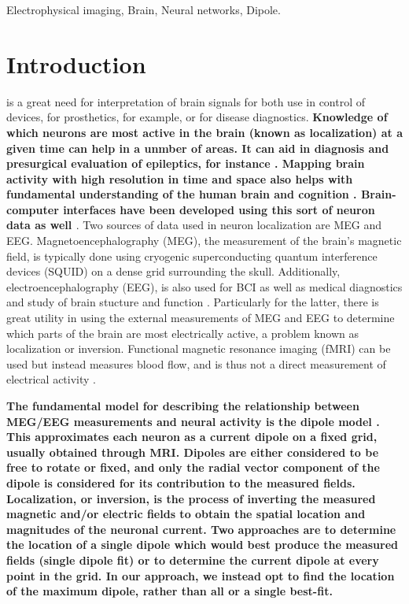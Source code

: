 \documentclass[journal,12pt,onecolumn,draftclsnofoot,]{IEEEtran}
\begin{document}
\begin{IEEEkeywords}
Electrophysical imaging, Brain, Neural networks, Dipole.
\end{IEEEkeywords}



\IEEEpeerreviewmaketitle



\section{Introduction}

 is a great need for interpretation of brain signals for both use in control of devices, for prosthetics, for example, or for disease diagnostics. \textbf{Knowledge of which neurons are most active in the brain (known as localization) at a given time can help in a unmber of areas. It can aid in diagnosis and presurgical evaluation of epileptics, for instance \cite{knake2006value}. Mapping brain activity with high resolution in time and space also helps with fundamental understanding of the human brain and cognition \cite{de2001localization}. Brain-computer interfaces have been developed using this sort of neuron data as well \cite{mellinger2007meg}}. Two sources of data used in neuron localization are MEG and EEG. Magnetoencephalography (MEG), the measurement of the brain's magnetic field, is typically done using cryogenic superconducting quantum interference devices (SQUID) on a dense grid surrounding the skull. Additionally, electroencephalography (EEG), is also used for BCI as well as medical diagnostics and study of brain stucture and function \cite{da2008impact}. Particularly for the latter, there is great utility in using the external measurements of MEG and EEG to determine which parts of the brain are most electrically active, a problem known as localization or inversion. Functional magnetic resonance imaging (fMRI) can be used but instead measures blood flow, and is thus not a direct measurement of electrical activity \cite{sharon2007advantage}. 

\textbf{The fundamental model for describing the relationship between MEG/EEG measurements and neural activity is the dipole model \cite{mosher1992multiple}. This approximates each neuron as a current dipole on a fixed grid, usually obtained through MRI. Dipoles are either considered to be free to rotate or fixed, and only the radial vector component of the dipole is considered for its contribution to the measured fields. Localization, or inversion, is the process of inverting the measured magnetic and/or electric fields to obtain the spatial location and magnitudes of the neuronal current. Two approaches are to determine the location of a single dipole which would best produce the measured fields (single dipole fit) or to determine the current dipole at every point in the grid. In our approach, we instead opt to find the location of the maximum dipole, rather than all or a single best-fit.}
\end{document}
